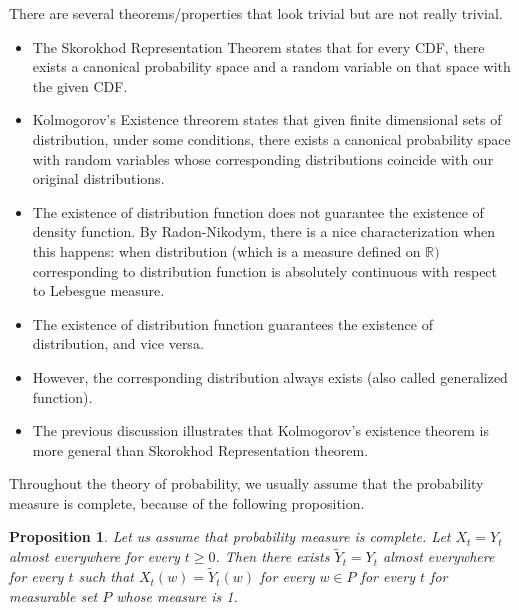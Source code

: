 \documentclass{article}
\newtheorem{proposition}[theorem]{Proposition}
\theoremstyle{remark}
\begin{document}
There are several theorems/properties that look trivial but are not really trivial.
\begin{itemize}
\item The Skorokhod Representation Theorem 
    states that for every CDF, there exists a canonical probability space and a random variable on that space with the given CDF.
\item Kolmogorov's Existence threorem states that given finite dimensional sets of distribution, under some conditions, there exists a canonical probability space with random variables whose 
corresponding distributions coincide with our original distributions.
\item The existence of distribution function does not guarantee the existence of density function. By Radon-Nikodym, there is a nice characterization when this happens: when distribution (which is a measure defined on $\mathbb{R})$ corresponding to distribution function is absolutely continuous with respect to
 Lebesgue measure.
\item The existence of distribution function guarantees the existence of distribution, and vice versa.
\item However, the corresponding distribution always exists (also called generalized function). 
\item The previous discussion illustrates that Kolmogorov's existence theorem is more general than Skorokhod Representation theorem.
\end{itemize}
Throughout the theory of probability, we usually assume that the probability measure is complete, because of the following proposition.
\begin{proposition}
    Let us assume that probability measure is complete. Let $X_t=Y_t$ almost everywhere for every $t\geq 0$.
    Then there exists $\tilde{Y}_t=Y_t$ almost everywhere for every $t$ such that $X_t(w)=\tilde{Y}_t(w)$ for every $w\in P$ for every $t$ for 
    measurable set $P$ whose measure is 1.
\end{proposition}
\end{document}
